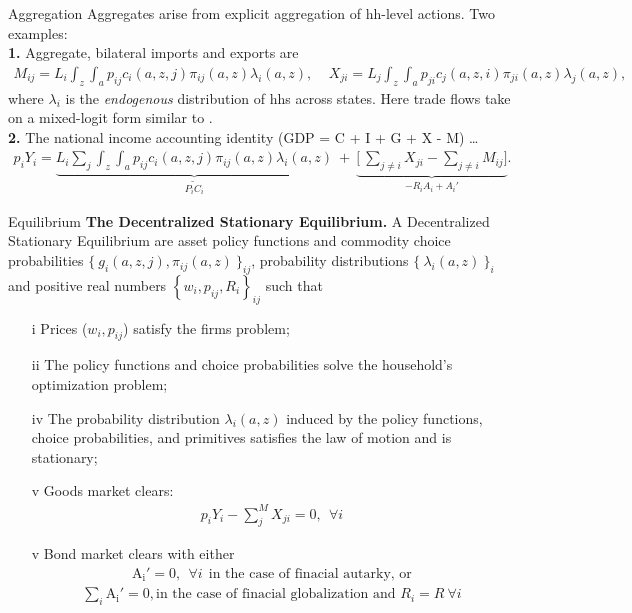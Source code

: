 \documentclass[9pt,pdftex,aspectratio=1610]{beamer}
\theoremstyle{definition}
\begin{document}
\begin{frame}[t]{Aggregation}
\smallskip
Aggregates arise from explicit aggregation of hh-level actions. Two examples:\\
\medskip
\medskip
\textbf{1.} Aggregate, bilateral imports and exports are
\begin{align*}
M_{ij} = L_i \int_{z} \int_{a}  p_{ij} c_{i}(a, z, j) \pi_{ij}(a, z) \lambda_i(a, z), \ \ \ \ \ X_{ji} = L_j \int_{z} \int_{a}  p_{ji} c_{j}(a, z, i) \pi_{ji}(a, z) \lambda_j(a, z),
\end{align*}
where $\lambda_i$ is the \emph{endogenous} distribution of hhs across states. Here trade flows take on a mixed-logit form similar to \citet*{berry1995automobile}. \\
\bigskip
\bigskip
\textbf{2.} The national income accounting identity (GDP = C + I + G + X - M) \ldots
\begin{align*}
p_{i} Y_{i}  =  \underbrace{L_{i} \sum_{j} \int_{z} \int_{a}  p_{ij} c_{i}(a, z, j) \pi_{ij}(a, z) \lambda_i(a, z)}_{\widetilde{P_{i} C_i}} \ + \ \underbrace{\bigg[\ \sum_{j\neq i}X_{ji} -  \sum_{j\neq i}M_{ij} \bigg]}_{-R_{i}A_i + A_{i}'}.
\end{align*}
\end{frame}

\begin{frame}[t]{Equilibrium}
\smallskip
\textbf{The Decentralized Stationary Equilibrium.} A Decentralized Stationary Equilibrium are asset policy functions and commodity choice probabilities $\{\  g_{i}(a, z, j), \pi_{ij}(a, z) \ \}_{ij}$, probability distributions $\{ \ \lambda_i(a, z) \ \}_{i}$ and positive real numbers $\left \{w_i, p_{ij}, R_i\right \}_{ij}$ such that
\begin{itemize}
\smallskip
\item[i]  Prices ($w_i, p_{ij}$) satisfy the firms problem;
\item[ii] The policy functions and choice probabilities solve the household's optimization problem;
\item[iv] The probability distribution $\lambda_i(a, z)$ induced by the policy functions, choice probabilities, and primitives satisfies the law of motion and is stationary;
\item[v] Goods market clears:
\begin{align*}
p_{i} Y_{i} - \sum_{j}^{M}  X_{ji} = 0, \ \ \forall i
\end{align*}
\item[v] Bond market clears with either
\begin{align*}
\mathrm{A_i'} = 0, \ \ \forall i \ \ \mbox{in the case of finacial autarky, or}
\end{align*}
\begin{align*}
\sum_{i}\mathrm{A_i'} = 0, \mbox{in the case of finacial globalization and $R_i = R \ \forall i$}
\end{align*}
\end{itemize}
\end{frame}
\end{document}
